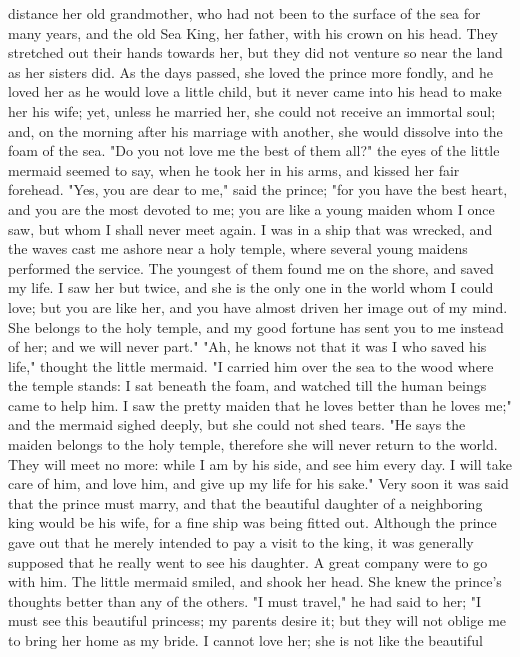 distance her old grandmother, who had not been to the surface of the
sea for many years, and the old Sea King, her father, with his crown
on his head. They stretched out their hands towards her, but they
did not venture so near the land as her sisters did.
    As the days passed, she loved the prince more fondly, and he loved
her as he would love a little child, but it never came into his head
to make her his wife; yet, unless he married her, she could not
receive an immortal soul; and, on the morning after his marriage
with another, she would dissolve into the foam of the sea.
    "Do you not love me the best of them all?" the eyes of the
little mermaid seemed to say, when he took her in his arms, and kissed
her fair forehead.
    "Yes, you are dear to me," said the prince; "for you have the best
heart, and you are the most devoted to me; you are like a young maiden
whom I once saw, but whom I shall never meet again. I was in a ship
that was wrecked, and the waves cast me ashore near a holy temple,
where several young maidens performed the service. The youngest of
them found me on the shore, and saved my life. I saw her but twice,
and she is the only one in the world whom I could love; but you are
like her, and you have almost driven her image out of my mind. She
belongs to the holy temple, and my good fortune has sent you to me
instead of her; and we will never part."
    "Ah, he knows not that it was I who saved his life," thought the
little mermaid. "I carried him over the sea to the wood where the
temple stands: I sat beneath the foam, and watched till the human
beings came to help him. I saw the pretty maiden that he loves
better than he loves me;" and the mermaid sighed deeply, but she could
not shed tears. "He says the maiden belongs to the holy temple,
therefore she will never return to the world. They will meet no
more: while I am by his side, and see him every day. I will take
care of him, and love him, and give up my life for his sake."
    Very soon it was said that the prince must marry, and that the
beautiful daughter of a neighboring king would be his wife, for a fine
ship was being fitted out. Although the prince gave out that he merely
intended to pay a visit to the king, it was generally supposed that he
really went to see his daughter. A great company were to go with
him. The little mermaid smiled, and shook her head. She knew the
prince's thoughts better than any of the others.
    "I must travel," he had said to her; "I must see this beautiful
princess; my parents desire it; but they will not oblige me to bring
her home as my bride. I cannot love her; she is not like the beautiful
